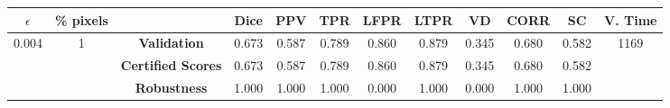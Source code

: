 \begin{longtable}{ c  c | c | c  c  c  c  c  c  c c c}
\toprule \textbf{$\epsilon$} & \textbf{\% pixels} & & \textbf{Dice} & \textbf{PPV} & \textbf{TPR} & \textbf{LFPR} & \textbf{LTPR} & \textbf{VD} & \textbf{CORR} & \textbf{SC} & \textbf{V. Time} \\
\midrule 
\multirow{3}{*}{0.004}  & \multirow{3}{*}{1} &\textbf{Validation} & 0.673 & 0.587 & 0.789 & 0.860 & 0.879 & 0.345 & 0.680 & 0.582 & \multirow{3}{*}{1169} \\
 & & \textbf{Certified Scores} & 0.673 & 0.587 & 0.789 & 0.860 & 0.879 & 0.345 & 0.680 & 0.582 & \\
& & \textbf{Robustness} & 1.000 & 1.000 & 1.000 & 0.000 & 1.000 & 0.000 & 1.000 & 1.000 & \\
\end{longtable}